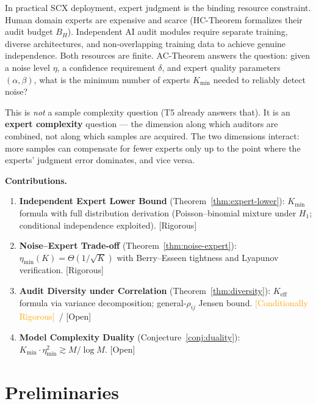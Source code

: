 \documentclass[12pt,a4paper]{article}
\newcommand{\rigorous}{\textcolor{green!50!black}{\small\textsf{[Rigorous]}}}
\newcommand{\conditionallyrigorous}{\textcolor{orange}{\small\textsf{[Conditionally Rigorous]}}}
\newcommand{\openquest}{\textcolor{red!70!black}{\small\textsf{[Open]}}}
\newcommand{\etamin}{\eta_{\min}}
\begin{document}
In practical \textsf{SCX} deployment, expert judgment is the binding resource constraint.
Human domain experts are expensive and scarce (HC-Theorem formalizes their audit
budget $B_H$).  Independent AI audit modules require separate training, diverse
architectures, and non-overlapping training data to achieve genuine
independence.  Both resources are finite.  AC-Theorem answers the question: given
a noise level $\eta$, a confidence requirement $\delta$, and expert quality
parameters $(\alpha,\beta)$, what is the minimum number of experts $K_{\min}$
needed to reliably detect noise?

This is \emph{not} a sample complexity question (T5 already answers that).
It is an \textbf{expert complexity} question --- the dimension along which
auditors are combined, not along which samples are acquired.  The two
dimensions interact: more samples can compensate for fewer experts only up
to the point where the experts' judgment error dominates, and vice versa.

\medskip\noindent
\textbf{Contributions.}
\begin{enumerate}[label=(\arabic*)]
    \item \textbf{Independent Expert Lower Bound}
          (Theorem~\ref{thm:expert-lower}): $K_{\min}$ formula with full
          distribution derivation (Poisson--binomial mixture under $H_1$;
          conditional independence exploited).  \rigorous
    \item \textbf{Noise--Expert Trade-off}
          (Theorem~\ref{thm:noise-expert}): $\etamin(K)=\Theta(1/\sqrt{K})$
          with Berry--Esseen tightness and Lyapunov verification.  \rigorous
    \item \textbf{Audit Diversity under Correlation}
          (Theorem~\ref{thm:diversity}): $K_{\mathrm{eff}}$ formula via
          variance decomposition; general-$\rho_{ij}$ Jensen bound.
          \conditionallyrigorous~/ \openquest
    \item \textbf{Model Complexity Duality}
          (Conjecture~\ref{conj:duality}): $K_{\min}\cdot\etamin^{2} \gtrsim M/\log M$.
          \openquest
\end{enumerate}

\section{Preliminaries}
\end{document}

